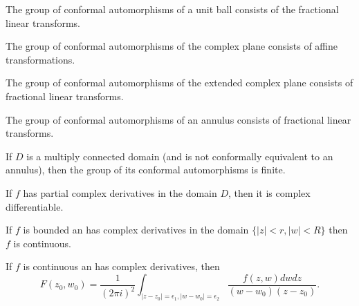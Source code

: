 \documentclass{unswmaths}
\begin{document}
\begin{theorem}
	The group of conformal automorphisms of a unit ball consists of the fractional linear transforms.
\end{theorem}

\begin{theorem}
	The group of conformal automorphisms of the complex plane consists of affine transformations.
\end{theorem}

\begin{corollary}
	The group of conformal automorphisms of the extended complex plane consists of fractional linear transforms.
\end{corollary}

\begin{theorem}
	The group of conformal automorphisms of an annulus consists of fractional linear transforms.
\end{theorem}

\begin{theorem}
	If $ D $ is a multiply connected domain (and is not conformally equivalent to an annulus), then the group of its conformal automorphisms is finite.
\end{theorem}

\begin{theorem}
	If $ f $ has partial complex derivatives in the domain $ D $, then it is complex differentiable.
\end{theorem}

\begin{lemma}
	If $ f $ is bounded an has complex derivatives in the domain $ \{ |z| < r, |w| < R \} $ then $ f $ is continuous.
\end{lemma}

\begin{lemma}
	If $ f $ is continuous an has complex derivatives, then
	$$
		F(z_0, w_0) = \frac{1}{(2 \pi i)^2} \int_{|z-z_0| = \epsilon_1, |w-w_0|=\epsilon_2} \frac{f(z,w)dwdz}{(w-w_0)(z-z_0)}.
	$$
\end{lemma}
\end{document}
